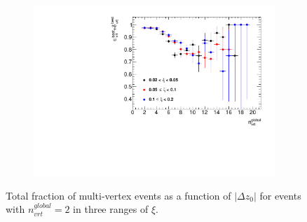 \begin{figure}[h!]
	\centering
	\begin{subfigure}{.49\textwidth}
		\includegraphics[width=\textwidth,page=9]{chapters/chrgSTAR/img/vertex/vertexEffi_ksi.pdf}
	\end{subfigure}
	\begin{minipage}{.49\textwidth}
		\caption{Total fraction of multi-vertex events as a function of $|\Delta z_0|$ for events with $n^{global}_{vrt}=2$  in three ranges of $\xi$.}
		\label{fig:vertexVetoDZ}
	\end{minipage}
\end{figure}
\captionsetup{format=default,indention=0pt,justification=justified}
\FloatBarrier